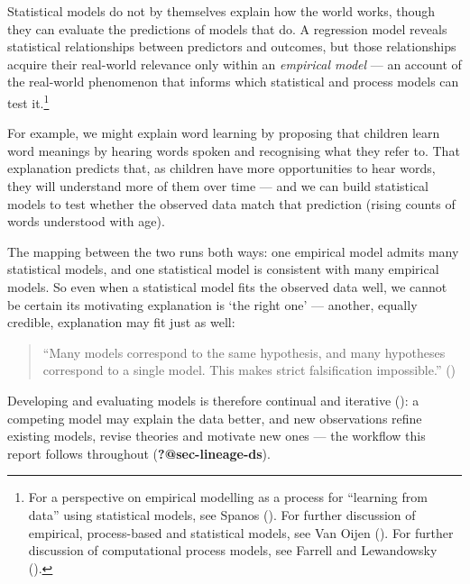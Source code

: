 \documentclass[
  11pt,
  a4paper,
]{report}
\begin{document}
Statistical models do not by themselves explain how the world works,
though they can evaluate the predictions of models that do. A regression
model reveals statistical relationships between predictors and outcomes,
but those relationships acquire their real-world relevance only within
an \emph{empirical model} --- an account of the real-world phenomenon
that informs which statistical and process models can test
it.\footnote{For a perspective on empirical modelling as a process for
  ``learning from data'' using statistical models, see Spanos
  (). For further discussion of empirical, process-based and
  statistical models, see Van Oijen
  (). For
  further discussion of computational process models, see Farrell and
  Lewandowsky
  ().}

For example, we might explain word learning by proposing that children
learn word meanings by hearing words spoken and recognising what they
refer to. That explanation predicts that, as children have more
opportunities to hear words, they will understand more of them over time
--- and we can build statistical models to test whether the observed
data match that prediction (rising counts of words understood with age).

The mapping between the two runs both ways: one empirical model admits
many statistical models, and one statistical model is consistent with
many empirical models. So even when a statistical model fits the
observed data well, we cannot be certain its motivating explanation is
`the right one' --- another, equally credible, explanation may fit just
as well:

\begin{quote}
``Many models correspond to the same hypothesis, and many hypotheses
correspond to a single model. This makes strict falsification
impossible.''
()
\end{quote}

Developing and evaluating models is therefore continual and iterative
(): a competing model may explain the data better, and new
observations refine existing models, revise theories and motivate new
ones --- the workflow this report follows throughout
(\textbf{?@sec-lineage-ds}).
\end{document}
